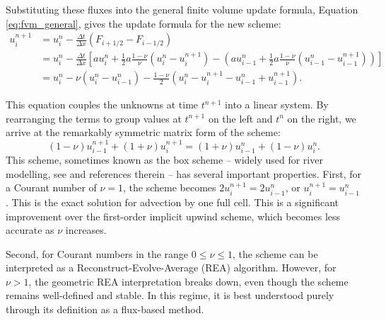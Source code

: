 Substituting these fluxes into the general finite volume update formula, Equation \eqref{eq:fvm_general}, gives the update formula for the new scheme:
\begin{equation*}
    \begin{split}
        u_{i}^{n+1} &= u_{i}^{n} - \frac{\Delta t}{\Delta x} \left( F_{i+1/2} - F_{i-1/2} \right) \\
                    &= u_{i}^{n} - \frac{\Delta t}{\Delta x} \left[
                    a u_{i}^{n} + \frac{1}{2} a \frac{1-\nu}{\nu}  \left( u_{i}^{n}-u_{i}^{n+1} \right)
                    -\left(
                    a u_{i-1}^{n} + \frac{1}{2} a \frac{1-\nu}{\nu}  \left( u_{i-1}^{n}-u_{i-1}^{n+1} \right)
                \right)
                \right] \\
                    &= u_{i}^{n} - \nu \left(
                        u_{i}^{n} - u_{i-1}^{n}
                    \right) - \frac{1-\nu}{2} \left( u_{i}^{n}-u_{i}^{n+1} - u_{i-1}^{n} + u_{i-1}^{n+1} \right).
    \end{split}
\end{equation*}

This equation couples the unknowns at time \(t^{n+1}\) into a linear system.
By rearranging the terms to group values at \(t^{n+1}\) on the left and \(t^n\) on the right, we arrive at the remarkably symmetric matrix form of the scheme:
\begin{equation}
    \label{eq:second_order_implicit_matrix}
    \left( 1-\nu \right) u_{i-1}^{n+1} + \left( 1+\nu \right) u_{i}^{n+1} =
    \left( 1+\nu \right) u_{i-1}^{n} + \left( 1-\nu \right) u_{i}^{n}.
\end{equation}
This scheme, sometimes known as the box scheme -- widely used for river modelling, see \cite{morton2005numerical} and references therein -- has several important properties.
First, for a Courant number of \(\nu=1\), the scheme becomes \(2u_i^{n+1} = 2u_{i-1}^n\), or \(u_i^{n+1} = u_{i-1}^n\).
This is the exact solution for advection by one full cell.
This is a significant improvement over the first-order implicit upwind scheme, which becomes less accurate as \(\nu\) increases.

Second, for Courant numbers in the range \(0 \leq \nu \leq 1\), the scheme can be interpreted as a
Reconstruct-Evolve-Average (REA) algorithm.
However, for \(\nu > 1\), the geometric REA interpretation breaks down, even though the scheme remains well-defined and stable.
In this regime, it is best understood purely through its definition as a flux-based method.

